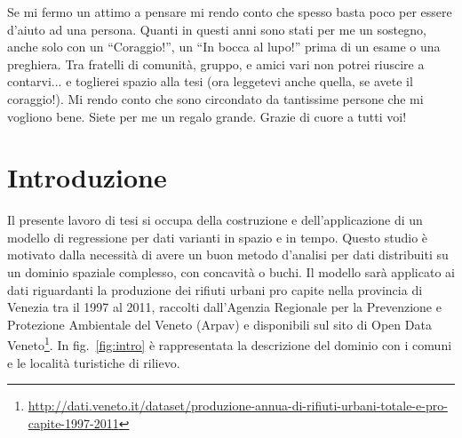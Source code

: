 \documentclass[a4paper,11pt,twoside,openright]{book}							%
\begin{document}
Se mi fermo un attimo a pensare mi rendo conto che spesso basta poco per essere d’aiuto ad una persona. Quanti in questi anni sono stati per me un sostegno, anche solo con un “Coraggio!”, un “In bocca al lupo!” prima di un esame o una preghiera. Tra fratelli di comunità, gruppo, e amici vari non potrei riuscire a contarvi... e toglierei spazio alla tesi (ora leggetevi anche quella, se avete il coraggio!). Mi rendo conto che sono circondato da tantissime persone che mi vogliono bene. Siete per me un regalo grande. Grazie di cuore a tutti voi! 

\thispagestyle{empty}

\frontmatter
\tableofcontents
{}
\listoffigures
{}
\listoftables
{}
\newpage
\thispagestyle{empty}
\mainmatter

\chapter{Introduzione}
\label{Cap:intro}

Il presente lavoro di tesi si occupa della costruzione e dell'applicazione di un modello di regressione per dati varianti in spazio e in tempo. Questo studio è motivato dalla necessità di avere un buon metodo d'analisi per dati distribuiti su un dominio spaziale complesso, con concavità o buchi. Il modello sarà applicato ai dati riguardanti la produzione dei rifiuti urbani pro capite nella provincia di Venezia tra il 1997 al 2011, raccolti dall'Agenzia Regionale per la Prevenzione e Protezione Ambientale del Veneto (Arpav) e disponibili sul sito di Open Data Veneto\footnote{\href{http://dati.veneto.it/dataset/produzione-annua-di-rifiuti-urbani-totale-e-pro-capite-1997-2011}{http://dati.veneto.it/dataset/produzione-annua-di-rifiuti-urbani-totale-e-pro-capite-1997-2011}}. In fig.~\ref{fig:intro} è rappresentata la descrizione del dominio con i comuni e le località turistiche di rilievo.
\end{document}
